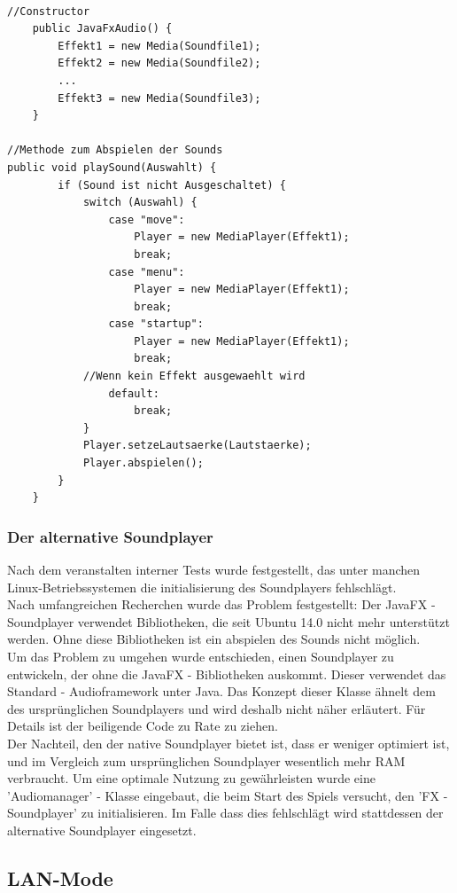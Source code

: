 \documentclass[12pt,a4paper]{article}
\begin{document}
\lstset{language=java}
\begin{lstlisting}

//Constructor
	public JavaFxAudio() {
		Effekt1 = new Media(Soundfile1);
		Effekt2 = new Media(Soundfile2);
		...
		Effekt3 = new Media(Soundfile3);
	}
	
//Methode zum Abspielen der Sounds
public void playSound(Auswahlt) {
		if (Sound ist nicht Ausgeschaltet) {
			switch (Auswahl) {
				case "move":
					Player = new MediaPlayer(Effekt1);
					break;
				case "menu":
					Player = new MediaPlayer(Effekt1);
					break;
				case "startup":
					Player = new MediaPlayer(Effekt1);
					break;
			//Wenn kein Effekt ausgewaehlt wird
				default:
					break;
			}
			Player.setzeLautsaerke(Lautstaerke);
			Player.abspielen();
		}
	}
\end{lstlisting}

\subsubsection{Der alternative  Soundplayer}
\label{SUBSUBSEC:SOUNDBUG}

Nach dem veranstalten interner Tests wurde festgestellt, das unter manchen Linux-Betriebssystemen die initialisierung des Soundplayers fehlschlägt.\\
Nach umfangreichen Recherchen wurde das Problem festgestellt: Der JavaFX - Soundplayer verwendet Bibliotheken, die seit Ubuntu 14.0 nicht mehr unterstützt werden. Ohne diese Bibliotheken ist ein abspielen des Sounds nicht möglich. \\Um das Problem zu umgehen wurde entschieden, einen Soundplayer zu entwickeln, der ohne die JavaFX - Bibliotheken auskommt. Dieser verwendet das Standard - Audioframework unter Java.  Das Konzept dieser Klasse ähnelt dem des ursprünglichen Soundplayers und wird deshalb nicht näher erläutert. Für Details ist der beiligende Code zu Rate zu ziehen. \\
Der Nachteil, den der native Soundplayer bietet ist, dass er weniger optimiert ist, und im Vergleich zum ursprünglichen Soundplayer wesentlich mehr RAM verbraucht. Um eine optimale Nutzung zu gewährleisten wurde eine 'Audiomanager' - Klasse eingebaut, die beim Start des Spiels versucht, den 'FX - Soundplayer' zu initialisieren. Im Falle dass dies fehlschlägt wird stattdessen der alternative Soundplayer eingesetzt. 

\newpage
\subsection{LAN-Mode}
\end{document}
